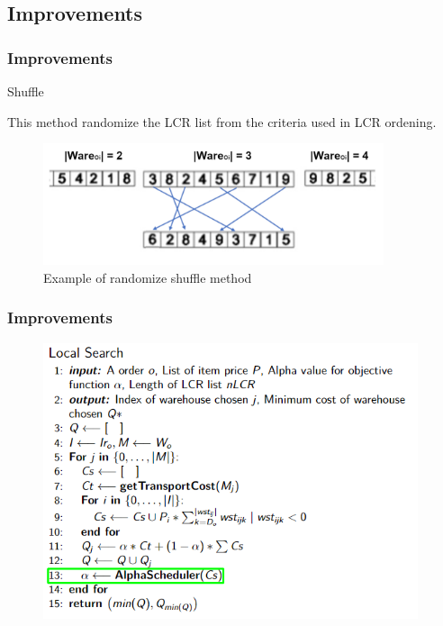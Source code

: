 \documentclass[t,compress,11pt,xcolor=dvipsnames,pdf,english]{beamer}
\begin{document}
\subsection{Improvements}

    \begin{frame}[c]{ }
    \frametitle{Improvements}
    \begin{block}{Shuffle}
        {
            This method randomize the LCR list from the criteria used in LCR ordening.
            \begin{figure}
                \includegraphics[width=10cm]{img/shuffle.png}
                \centering
                \caption{Example of randomize shuffle method}
            \end{figure}
            
        }
    \end{block}

\end{frame}

\begin{frame}[c]{ }
    \frametitle{Improvements}
    \begin{figure}
        \includegraphics[width=11cm]{img/LOCALALGO_1.png}
        \centering
    \end{figure}        
\end{frame}
\end{document}
